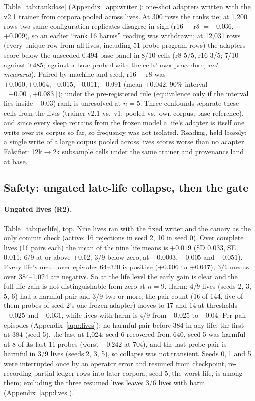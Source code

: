 \documentclass{article}
\newcommand{\nm}{\emph{not measured}}
\begin{document}
Table~\ref{tab:rankdose} (Appendix~\ref{app:writer}): one-shot adapters written with the v2.1 trainer from corpora pooled across lives. At 300 rows the ranks tie; at 1{,}200 rows two same-configuration replicates disagree in sign (r16 $-$ r8 $= -0.036$, $+0.009$), so an earlier ``rank 16 harms'' reading was withdrawn; at 12{,}031 rows (every unique row from all lives, including 51 probe-program rows) the adapters score below the unseeded 0.494 base panel in 8/10 cells (r8 5/5, r16 3/5; 7/10 against 0.485; against a base probed with the cells' own procedure, \nm). Paired by machine and seed, r16 $-$ r8 was $+0.060, +0.064, -0.015, +0.011, +0.091$ (mean $+0.042$, 90\% interval $[+0.001, +0.083]$); under the pre-registered rule (equivalence only if the interval lies inside $\pm 0.03$) rank is unresolved at $n = 5$. Three confounds separate these cells from the lives (trainer v2.1 vs.\ v1; pooled vs.\ own corpus; base reference), and since every sleep retrains from the frozen model a life's adapter is itself one write over its corpus so far, so frequency was not isolated. Reading, held loosely: a single write of a large corpus pooled across lives scores worse than no adapter. Falsifier: 12k$\to$2k subsample cells under the same trainer and provenance land at base.

\subsection{Safety: ungated late-life collapse, then the gate}
\label{sec:safety}

\paragraph{Ungated lives (R2).} Table~\ref{tab:perlife}, top. Nine lives ran with the fixed writer and the canary as the only commit check (active: 16 rejections in seed 2, 10 in seed 0). Over complete lives (16 pairs each) the mean of the nine life means is $+0.019$ (SD 0.033, SE 0.011; 6/9 at or above $+0.02$; 3/9 below zero, at $-0.0003$, $-0.005$ and $-0.051$). Every life's mean over episodes 64--320 is positive ($+0.006$ to $+0.047$); 3/9 means over 384--1{,}024 are negative. So at the life level the early gain is clear and the full-life gain is not distinguishable from zero at $n = 9$. Harm: 4/9 lives (seeds 2, 3, 5, 6) had a harmful pair and 3/9 two or more; the pair count (16 of 144, five of them probes of seed 2's one frozen adapter) moves to 17 and 14 at thresholds $-0.025$ and $-0.031$, while lives-with-harm is 4/9 from $-0.025$ to $-0.04$. Per-pair episodes (Appendix~\ref{app:lives}): no harmful pair before 384 in any life; the first at 384 (seed 5), the last at 1{,}024; seed 6 recovered from 640, seed 5 was harmful at 8 of its last 11 probes (worst $-0.242$ at 704), and the last probe pair is harmful in 3/9 lives (seeds 2, 3, 5), so collapse was not transient. Seeds 0, 1 and 5 were interrupted once by an operator error and resumed from checkpoint, re-recording partial ledger rows into later corpora; seed 5, the worst life, is among them; excluding the three resumed lives leaves 3/6 lives with harm (Appendix~\ref{app:lives}).
\end{document}
